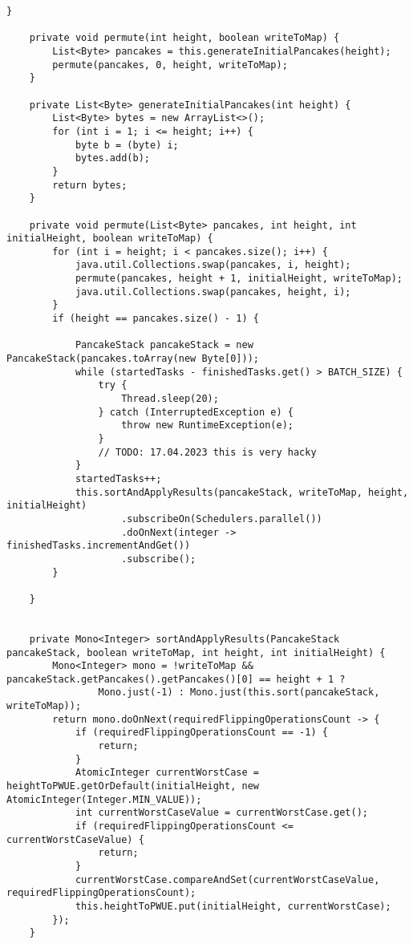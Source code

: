 \begin{lstlisting}[label={lst:source}]
    }

    private void permute(int height, boolean writeToMap) {
        List<Byte> pancakes = this.generateInitialPancakes(height);
        permute(pancakes, 0, height, writeToMap);
    }

    private List<Byte> generateInitialPancakes(int height) {
        List<Byte> bytes = new ArrayList<>();
        for (int i = 1; i <= height; i++) {
            byte b = (byte) i;
            bytes.add(b);
        }
        return bytes;
    }

    private void permute(List<Byte> pancakes, int height, int initialHeight, boolean writeToMap) {
        for (int i = height; i < pancakes.size(); i++) {
            java.util.Collections.swap(pancakes, i, height);
            permute(pancakes, height + 1, initialHeight, writeToMap);
            java.util.Collections.swap(pancakes, height, i);
        }
        if (height == pancakes.size() - 1) {

            PancakeStack pancakeStack = new PancakeStack(pancakes.toArray(new Byte[0]));
            while (startedTasks - finishedTasks.get() > BATCH_SIZE) {
                try {
                    Thread.sleep(20);
                } catch (InterruptedException e) {
                    throw new RuntimeException(e);
                }
                // TODO: 17.04.2023 this is very hacky
            }
            startedTasks++;
            this.sortAndApplyResults(pancakeStack, writeToMap, height, initialHeight)
                    .subscribeOn(Schedulers.parallel())
                    .doOnNext(integer -> finishedTasks.incrementAndGet())
                    .subscribe();
        }

    }


    private Mono<Integer> sortAndApplyResults(PancakeStack pancakeStack, boolean writeToMap, int height, int initialHeight) {
        Mono<Integer> mono = !writeToMap && pancakeStack.getPancakes().getPancakes()[0] == height + 1 ?
                Mono.just(-1) : Mono.just(this.sort(pancakeStack, writeToMap));
        return mono.doOnNext(requiredFlippingOperationsCount -> {
            if (requiredFlippingOperationsCount == -1) {
                return;
            }
            AtomicInteger currentWorstCase = heightToPWUE.getOrDefault(initialHeight, new AtomicInteger(Integer.MIN_VALUE));
            int currentWorstCaseValue = currentWorstCase.get();
            if (requiredFlippingOperationsCount <= currentWorstCaseValue) {
                return;
            }
            currentWorstCase.compareAndSet(currentWorstCaseValue, requiredFlippingOperationsCount);
            this.heightToPWUE.put(initialHeight, currentWorstCase);
        });
    }


\end{lstlisting}
